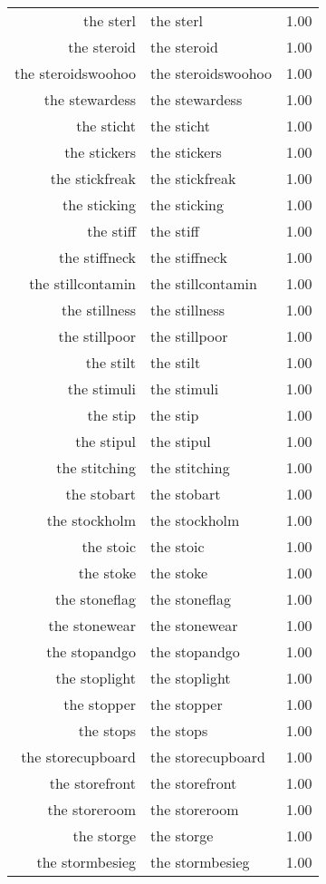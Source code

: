 \begin{table}[ht]
\begin{tabular}{rlr}
  the sterl & the sterl & 1.00 \\ 
  the steroid & the steroid & 1.00 \\ 
  the steroidswoohoo & the steroidswoohoo & 1.00 \\ 
  the stewardess & the stewardess & 1.00 \\ 
  the sticht & the sticht & 1.00 \\ 
  the stickers & the stickers & 1.00 \\ 
  the stickfreak & the stickfreak & 1.00 \\ 
  the sticking & the sticking & 1.00 \\ 
  the stiff & the stiff & 1.00 \\ 
  the stiffneck & the stiffneck & 1.00 \\ 
  the stillcontamin & the stillcontamin & 1.00 \\ 
  the stillness & the stillness & 1.00 \\ 
  the stillpoor & the stillpoor & 1.00 \\ 
  the stilt & the stilt & 1.00 \\ 
  the stimuli & the stimuli & 1.00 \\ 
  the stip & the stip & 1.00 \\ 
  the stipul & the stipul & 1.00 \\ 
  the stitching & the stitching & 1.00 \\ 
  the stobart & the stobart & 1.00 \\ 
  the stockholm & the stockholm & 1.00 \\ 
  the stoic & the stoic & 1.00 \\ 
  the stoke & the stoke & 1.00 \\ 
  the stoneflag & the stoneflag & 1.00 \\ 
  the stonewear & the stonewear & 1.00 \\ 
  the stopandgo & the stopandgo & 1.00 \\ 
  the stoplight & the stoplight & 1.00 \\ 
  the stopper & the stopper & 1.00 \\ 
  the stops & the stops & 1.00 \\ 
  the storecupboard & the storecupboard & 1.00 \\ 
  the storefront & the storefront & 1.00 \\ 
  the storeroom & the storeroom & 1.00 \\ 
  the storge & the storge & 1.00 \\ 
  the stormbesieg & the stormbesieg & 1.00 \\ 

\end{tabular}
\end{table}
